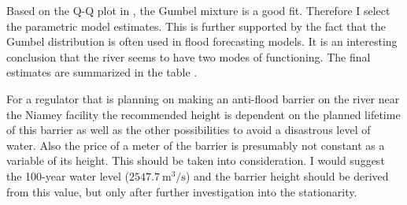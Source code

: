 Based on the Q-Q plot in , the Gumbel mixture is a good fit. Therefore I select the 
parametric model estimates. This is further
supported by the fact that the Gumbel distribution is often used in flood forecasting models. It is an interesting
conclusion that the river seems to have two modes of functioning. The final estimates are summarized in the table
.

For a regulator that is planning on making an anti-flood barrier on the river near the Niamey facility the recommended
height is dependent on the planned lifetime of this barrier as well as the other possibilities to avoid a disastrous
level of water. Also the price of a meter of the barrier is presumably not constant as a variable of its height. This
should be taken into consideration. I would suggest the 100-year water level (\(\qty{2547.7}{\meter\cubed\per\second}\))
and the barrier height should be derived from this value, but only after further investigation into the stationarity.

\begin{table}[hbt]
    \centering
    
    \caption{Final estimates of the objective values based on the Gumbel mixture parametric estimates.}
    \label{tab:summary_estimates}
\end{table}
